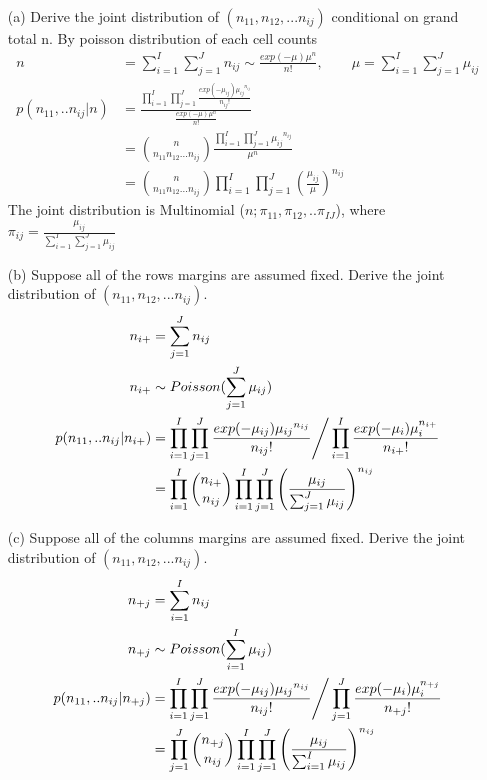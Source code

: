 \documentclass[11pt]{article} %
\begin{document}
\begin{itemize}
	\item [(a)] Derive the joint distribution of $(n_{11}, n_{12},... n_{ij})$ conditional on grand total n.
	By poisson distribution of each cell counts
	\begin{align*}
	n &= \sum_{i=1}^I \sum_{j=1}^J n_{ij} \sim \frac{exp(-\mu) \mu^n }{n!}, \qquad \mu= \sum_{i=1}^I \sum_{j=1}^J \mu_{ij}\\ 
	p(n_{11},..n_{ij}|n) &= \frac{\prod_{i=1}^I \prod_{j=1}^J \frac{exp(-\mu_{ij})  {\mu_{ij}}^{n_{ij}}}{n_{ij}!}}{\frac{exp(-\mu) \mu^n }{n!}} \\
	&= {n \choose n_{11} n_{12} ... n_{ij}} \frac{\prod_{i=1}^I \prod_{j=1}^J {\mu_{ij}}^{n_{ij}}}{\mu^n } \\
	&= {n \choose n_{11} n_{12} ... n_{ij}} \prod_{i=1}^I \prod_{j=1}^J \left( \frac{\mu_{ij}}{\mu } \right)^{n_{ij}}
	\end{align*}	
The joint distribution is Multinomial ($n; \pi_{11}, \pi_{12},.. \pi_{IJ}$), where $\pi_{ij} = \frac{\mu_{ij}}{\sum_{i=1}^I \sum_{j=1}^J \mu_{ij} }$
	\item [(b)] Suppose all of the rows margins are assumed fixed. Derive the joint distribution of $(n_{11}, n_{12},... n_{ij})$.
\begin{align*}
	n_{i+} &= \sum_{j=1}^J n_{ij}\\
	n_{i+} & \sim Poisson (\sum_{j=1}^J \mu_{ij})\\
	p(n_{11},..n_{ij}|n_{i+}) &= \prod_{i=1}^I \prod_{j=1}^J \frac{exp(-\mu_{ij})  {\mu_{ij}}^{n_{ij}}}{n_{ij}!} \Bigg{/} \prod_{i=1}^I \frac{exp(-\mu_i) \mu_i^{n_{i+}}}{n_{i+}!}\\
	&= \prod_{i=1}^I {n_{i+} \choose n_{ij}} \prod_{i=1}^I \prod_{j=1}^J \left( \frac{\mu_{ij}}{\sum_{j=1}^J \mu_{ij}} \right)^{n_{ij}}
\end{align*}
	\item [(c)] Suppose all of the columns margins are assumed fixed. Derive the joint distribution of $(n_{11}, n_{12},... n_{ij})$.
\begin{align*}
	n_{+j} &= \sum_{i=1}^I n_{ij}\\
	n_{+j} & \sim Poisson (\sum_{i=1}^I \mu_{ij})\\
	p(n_{11},..n_{ij}|n_{+j}) &= \prod_{i=1}^I \prod_{j=1}^J \frac{exp(-\mu_{ij})  {\mu_{ij}}^{n_{ij}}}{n_{ij}!} \Bigg{/} \prod_{j=1}^J \frac{exp(-\mu_i) \mu_i^{n_{+j}}}{n_{+j}!}\\
	&= \prod_{j=1}^J {n_{+j} \choose n_{ij}} \prod_{i=1}^I \prod_{j=1}^J \left( \frac{\mu_{ij}}{\sum_{i=1}^I \mu_{ij}} \right)^{n_{ij}}
\end{align*}



\end{itemize}
\end{document}

